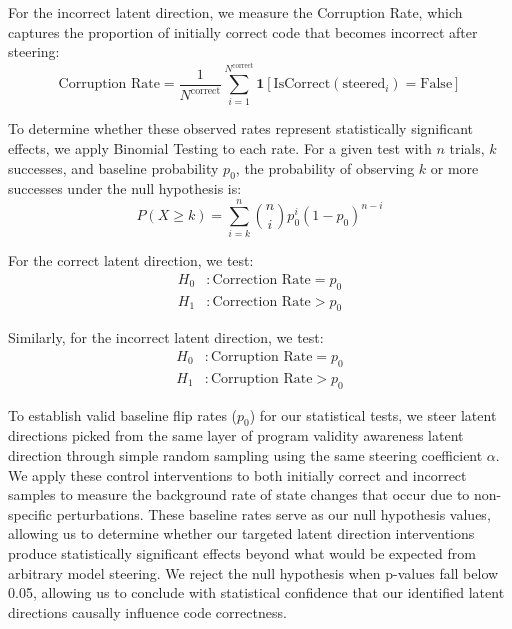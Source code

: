 For the incorrect latent direction, we measure the Corruption Rate, which captures the proportion of initially correct code that becomes incorrect after steering:
\begin{equation}
\text{Corruption Rate} = \frac{1}{N^{\text{correct}}} \sum_{i=1}^{N^{\text{correct}}} \mathbf{1}[\text{IsCorrect}(\text{steered}_i)= \text{False}]
\end{equation}

To determine whether these observed rates represent statistically significant effects, we apply Binomial Testing to each rate. For a given test with $n$ trials, $k$ successes, and baseline probability $p_0$, the probability of observing $k$ or more successes under the null hypothesis is:
\begin{equation}
P(X \geq k) = \sum_{i=k}^{n} \binom{n}{i} p_0^i (1-p_0)^{n-i}
\end{equation}

For the correct latent direction, we test:
\begin{align}
H_0&: \text{Correction Rate} = p_0 \\
H_1&: \text{Correction Rate} > p_0
\end{align}

Similarly, for the incorrect latent direction, we test:
\begin{align}
H_0&: \text{Corruption Rate} = p_0 \\
H_1&: \text{Corruption Rate} > p_0
\end{align}

To establish valid baseline flip rates ($p_0$) for our statistical tests, we steer latent directions picked from the same layer of program validity awareness latent direction through simple random sampling using the same steering coefficient $\alpha$. We apply these control interventions to both initially correct and incorrect samples to measure the background rate of state changes that occur due to non-specific perturbations. These baseline rates serve as our null hypothesis values, allowing us to determine whether our targeted latent direction interventions produce statistically significant effects beyond what would be expected from arbitrary model steering.  We reject the null hypothesis when p-values fall below 0.05, allowing us to conclude with statistical confidence that our identified latent directions causally influence code correctness.
